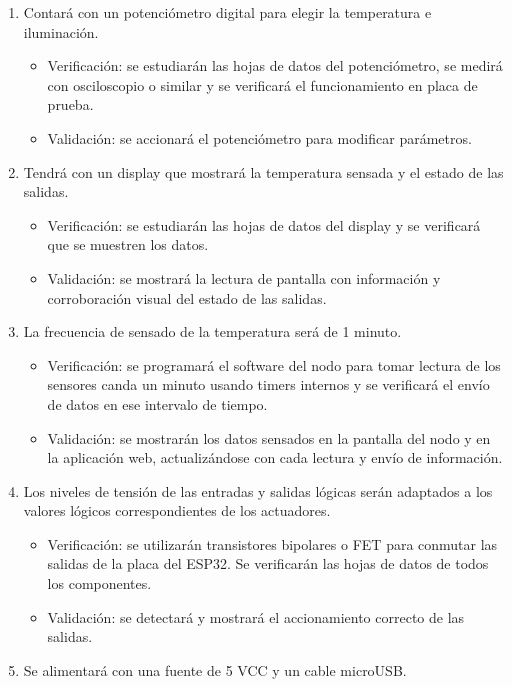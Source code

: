 \documentclass[
11pt, %
]{charter}
\begin{document}
\begin{enumerate}
\begin{enumerate}
\begin{itemize}
			\end{itemize}
			\item Contará con un potenciómetro digital para elegir la temperatura e iluminación.
			\begin{itemize}
				\item Verificación: se estudiarán las hojas de datos del potenciómetro, se medirá con osciloscopio o similar y se verificará el funcionamiento en placa de prueba.
				\item Validación: se accionará el potenciómetro para modificar parámetros.
			\end{itemize}
			\item Tendrá con un display que mostrará la temperatura sensada y el estado de las salidas.
			\begin{itemize}
				\item Verificación: se estudiarán las hojas de datos del display y se verificará que se muestren los datos.
				\item Validación: se mostrará la lectura de pantalla con información y corroboración visual del estado de las salidas.
			\end{itemize}
			\item La frecuencia de sensado de la temperatura será de 1 minuto.
			\begin{itemize}
				\item Verificación: se programará el software del nodo para tomar lectura de los sensores canda un minuto usando timers internos y se verificará el envío de datos en ese intervalo de tiempo.
				\item Validación: se mostrarán los datos sensados en la pantalla del nodo y en la aplicación web, actualizándose con cada lectura y envío de información.
			\end{itemize}
			\item Los niveles de tensión de las entradas y salidas lógicas serán adaptados a los valores lógicos correspondientes de los actuadores.
			\begin{itemize}
				\item Verificación: se utilizarán transistores bipolares o FET para conmutar las salidas de la placa del ESP32. Se verificarán las hojas de datos de todos los componentes.
				\item Validación: se detectará y mostrará el accionamiento correcto de las salidas.
			\end{itemize}
			\item Se alimentará con una fuente de 5 VCC y un cable microUSB.

\end{enumerate}
\end{enumerate}
\end{document}
